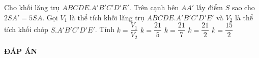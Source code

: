 \begin{ex}%
Cho khối lăng trụ $ABCDE.A'B'C'D'E'$. Trên cạnh bên $AA'$ lấy điểm $S$ sao cho $2SA' = 5SA$. Gọi $V_1$ là thể tích khối lăng trụ $ABCDE.A'B'C'D'E'$ và $V_2$ là thể tích khối chóp $S.A'B'C'D'E'$. Tính $k = \dfrac{V_1}{V_2}$
\choice
{\True $k = \dfrac{21}{5}$}
{$k = \dfrac{21}{7}$}
{$k = \dfrac{21}{2}$}
{$k = \dfrac{15}{2}$}
\end{ex}

\newpage
\begin{center}
	\textbf{ĐÁP ÁN}
\end{center}
\begin{multicols}{10}
	 
\end{multicols}
